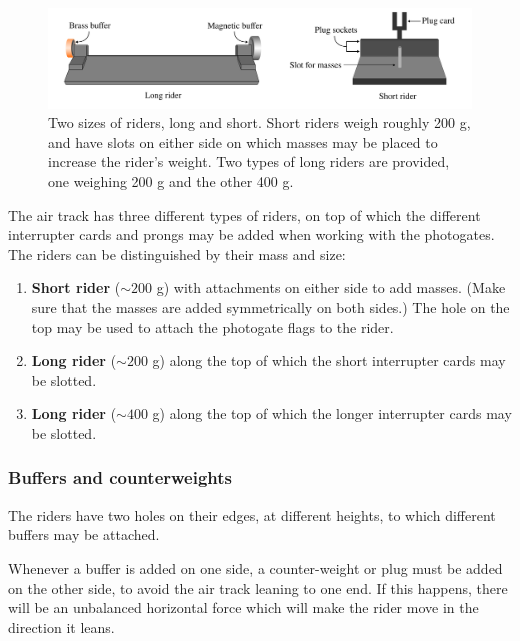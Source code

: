 \begin{figure}[!htb]
    \centering
    \includegraphics[width=\textwidth]{figs/airtrack/airtack-riders.png}
    \caption{Two sizes of riders, long and short. Short riders weigh roughly 200 g, and have slots on either side on which masses may be placed to increase the rider's weight. Two types of long riders are provided, one weighing 200 g and the other 400 g. }
    \label{fig:airtrack-riders}
\end{figure}

The air track has three different types of riders, on top of which the different interrupter cards and prongs may be added when working with the photogates. The riders can be distinguished by their mass and size:

\begin{enumerate}
    \item \textbf{Short rider} ($\sim 200$ g) with attachments on either side to add masses. (Make sure that the masses are added symmetrically on both sides.) The hole on the top may be used to attach the photogate flags to the rider.
    
    \item \textbf{Long rider} ($\sim 200$ g) along the top of which the short interrupter cards may be slotted.
    
    \item \textbf{Long rider} ($\sim 400$ g) along the top of which the longer interrupter cards may be slotted.
\end{enumerate}

\subsubsection*{Buffers and counterweights}

The riders have two holes on their edges, at different heights, to which different buffers may be attached. 

\begin{imp}
Whenever a buffer is added on one side, a counter-weight or plug must be added on the other side, to avoid the air track leaning to one end. If this happens, there will be an unbalanced horizontal force which will make the rider move in the direction it leans.
\end{imp}

